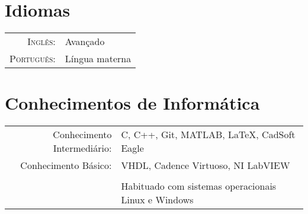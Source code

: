 \documentclass[a4paper,10pt]{article} %
\begin{document}

\section{Idiomas}

\begin{tabular}{rl}
\textsc{Inglês:} & Avançado \\
\textsc{Português:} & Língua materna\\
\end{tabular}


\section{Conhecimentos de Informática}

\begin{tabular}{rl}
Conhecimento Intermediário: & C, C++, Git, MATLAB, LaTeX, CadSoft Eagle  \\
Conhecimento Básico: & VHDL, Cadence Virtuoso, NI LabVIEW\\
&\\
& Habituado com sistemas operacionais Linux e Windows\\
\end{tabular}
\end{document}
